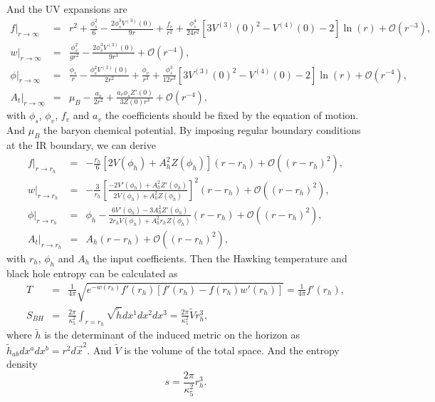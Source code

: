 \documentclass[a4paper,12pt]{article}
\numberwithin{equation}{section}
\begin{document}
And the UV expansions are
\begin{eqnarray}
   \left. f\right| _{r\rightarrow \infty}&=&r^2+\frac{\phi_s^2}{6}-\frac{2\phi_s^3V^{(3)}(0)}{9r}+\frac{f_v}{r^2}+\frac{\phi_s^4}{24r^2}\left[3V^{(3)}(0)^2-V^{(4)}(0)-2\right] \ln(r) +\mathcal{O}(r^{-3}), \nonumber \\
   \left.   w\right| _{r\rightarrow \infty}&=&\frac{\phi_s^2}{gr^2}-\frac{2\phi_s^3 V^{(3)}(0)}{9r^3}+\mathcal{O}(r^{-4}), \nonumber  \\
    \left.  \phi\right| _{r\rightarrow \infty}&=&\frac{\phi_s}{r}-\frac{\phi_s^2 V^{(3)}(0)}{2r^2}+\frac{\phi_v}{r^3}+\frac{\phi_s^3}{12 r^3}\left[3V^{(3)}(0)^2-V^{(4)}(0)-2 \right]\ln(r) +\mathcal{O}(r^{-4}), \nonumber  \\
    \left.  A_t\right| _{r\rightarrow \infty}&=& \mu_B-\frac{a_v}{2r^2}+\frac{a_v \phi_s Z'(0)}{3Z(0) r^3}+\mathcal{O}(r^{-4}),
\end{eqnarray}
with $\phi_s$, $\phi_v$, $f_v$ and $a_v$ the coefficients should be fixed by the equation of motion. And $\mu_B$ the baryon chemical potential. By imposing regular boundary conditions at the IR boundary, we can derive
\begin{eqnarray}
    \left. f\right| _{r\rightarrow r_h}&=&-\frac{r_h}{6}\left[ 2V(\phi_h)+A_h^2 Z(\phi_h) \right](r-r_h)+\mathcal{O}((r-r_h)^{2}) ,\nonumber \\
    \left.   w\right| _{r\rightarrow r_h}&=& -\frac{3}{r_h}\left[\frac{-2V'(\phi_h)+A_h^2Z'(\phi_h)}{2V(\phi_h)+A_h^2Z(\phi_h)}\right]^2(r-r_h) +\mathcal{O}((r-r_h)^{2}) ,\nonumber \\
    \left.  \phi\right| _{r\rightarrow r_h}&=&\phi_h-\frac{6V'(\phi_h)-3A_h^2 Z'(\phi_h)}{2r_h V(\phi_h)+A_h^2 r_h Z(\phi_h)}(r-r_h)+\mathcal{O}((r-r_h)^{2}), \nonumber \\
   \left.  A_t\right| _{r\rightarrow r_h}&=& A_h(r-r_h)+\mathcal{O}((r-r_h)^{2}),
\end{eqnarray}
with $r_h$, $\phi_h$ and $A_h$ the input coefficients.
Then the Hawking temperature and black hole entropy can be calculated as
\begin{eqnarray}
    T&=&\frac{1}{4\pi}\sqrt{e^{-w(r_h)}f'(r_h)\left[f'(r_h)-f(r_h)w'(r_h)\right]}=\frac{1}{4\pi} f'(r_h),\\
    S_{BH}&=&\frac{2\pi}{\kappa_5^2}\int_{r=r_h}\sqrt{\tilde{h}}dx^1dx^2dx^3=\frac{2\pi}{\kappa_5^2}\tilde{V}r_h^3,
\end{eqnarray}
where $\tilde{h}$ is the determinant of the induced metric on the horizon as $\tilde{h}_{ab}dx^adx^b=r^2 d\vec{x}^2$. And $\tilde{V}$ is the volume of the total space. And the entropy density
\begin{equation}
    s=\frac{2\pi}{\kappa_5^2}r_h^3.
\end{equation}
\end{document}
